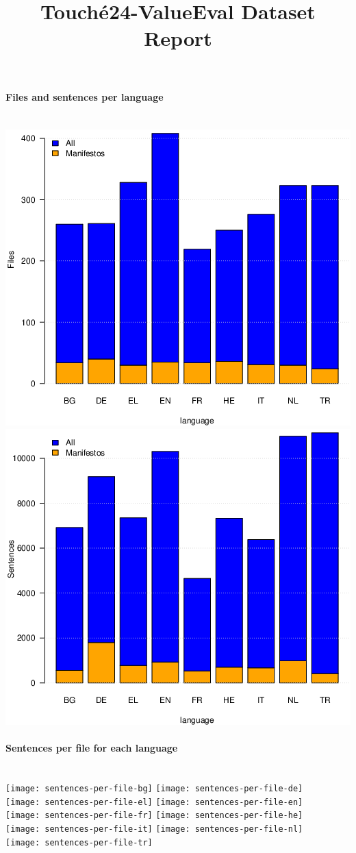 \documentclass[a4paper]{article}
\title{Touch{\'e}24-ValueEval Dataset Report}
\newenvironment{figures}[1]{\noindent\begin{minipage}{\linewidth}\paragraph{#1}\noindent\\[\baselineskip]}{\end{minipage}}
\begin{document}
\maketitle



\begin{figures}{Files and sentences per language}
\includegraphics[width=.49\linewidth]{files-per-language}%
\hfill%
\includegraphics[width=.49\linewidth]{sentences-per-language}
\end{figures}



\begin{figures}{Sentences per file for each language}
\texttt{[image: sentences-per-file-bg]}%
\hfill%
\texttt{[image: sentences-per-file-de]}\\[4ex]
\texttt{[image: sentences-per-file-el]}%
\hfill%
\texttt{[image: sentences-per-file-en]}\\[4ex]
\texttt{[image: sentences-per-file-fr]}%
\hfill%
\texttt{[image: sentences-per-file-he]}\\[4ex]
\texttt{[image: sentences-per-file-it]}%
\hfill%
\texttt{[image: sentences-per-file-nl]}\\[4ex]
\texttt{[image: sentences-per-file-tr]}
\end{figures}
\end{document}
